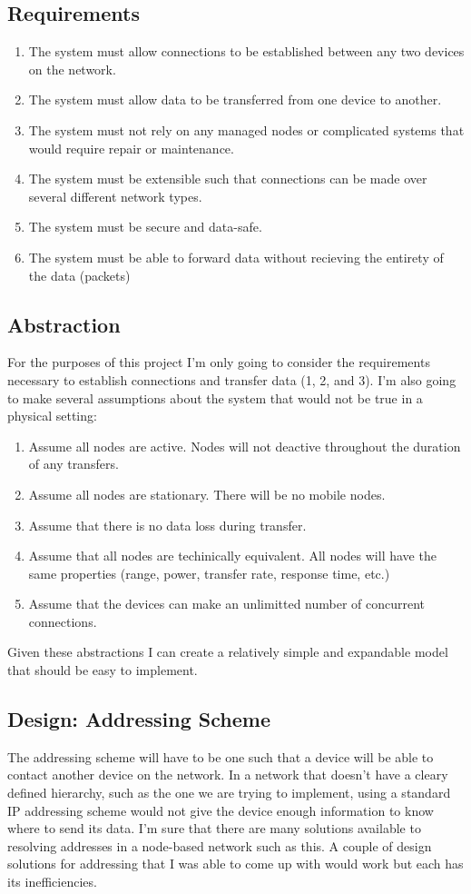 \documentclass{amsart}
\begin{document}
\subsection{Requirements}
\begin{enumerate}
\item The system must allow connections to be established between any two devices on the network.
\item The system must allow data to be transferred from one device to another.
\item The system must not rely on any managed nodes or complicated systems that would require repair or maintenance.
\item The system must be extensible such that connections can be made over several different network types.
\item The system must be secure and data-safe.
\item The system must be able to forward data without recieving the entirety of the data (packets)
\end{enumerate}
\subsection{Abstraction}
For the purposes of this project I'm only going to consider the requirements necessary to establish connections and transfer data (1, 2, and 3). I'm also going to make several assumptions about the system that would not be true in a physical setting:
\begin{enumerate}
\item Assume all nodes are active. Nodes will not deactive throughout the duration of any transfers.
\item Assume all nodes are stationary. There will be no mobile nodes.
\item Assume that there is no data loss during transfer.
\item Assume that all nodes are techinically equivalent. All nodes will have the same properties (range, power, transfer rate, response time, etc.)
\item Assume that the devices can make an unlimitted number of concurrent connections.
\end{enumerate}
Given these abstractions I can create a relatively simple and expandable model that should be easy to implement.
\subsection{Design: Addressing Scheme}
The addressing scheme will have to be one such that a device will be able to contact another device on the network. In a network that doesn't have a cleary defined hierarchy, such as the one we are trying to implement, using a standard IP addressing scheme would not give the device enough information to know where to send its data. I'm sure that there are many solutions available to resolving addresses in a node-based network such as this. A couple of design solutions for addressing that I was able to come up with would work but each has its inefficiencies.
\end{document}

